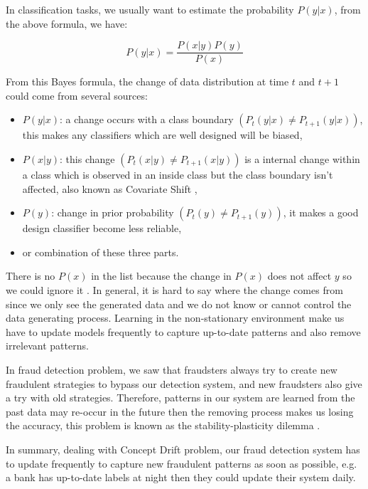 In classification tasks, we usually want to estimate the probability $P(y|x)$, from the above formula, we have:


\begin{equation}
P(y|x) = \frac{P(x|y)P(y)}{P(x)}
\end{equation}


From this Bayes formula, the change of data distribution at time $t$ and $t + 1$ could come from several sources\citep{kelly1999impact}:

\begin{itemize}
\item $P(y|x)$: a change occurs with a class boundary $( P_t(y|x) \neq P_{t+1}(y|x) )$, this makes any classifiers which are well designed will be biased,
\item $P(x|y)$: this change $( P_t(x|y) \neq P_{t+1}(x|y) )$ is a internal change within a class which is observed in an inside class but the class boundary isn't affected, also known as Covariate Shift \citep{moreno2012unifying},
\item $P(y)$: change in prior probability $( P_t(y) \neq P_{t+1}(y) )$, it makes a good design classifier become less reliable,
\item or combination of these three parts.
\end{itemize}

There is no $P(x)$ in the list because the change in $P(x)$ does not affect $y$ so we could ignore it \citep{hoens2012learning}.  In general, it is hard to say where the change comes from since we only see the generated data and we do not know or cannot control the data generating process. Learning in the non-stationary environment make us have to update models frequently to capture up-to-date patterns and also remove irrelevant patterns.

In fraud detection problem, we saw that fraudsters always try to create new fraudulent strategies to bypass our detection system, and new fraudsters also give a try with old strategies. Therefore, patterns in our system are learned from the past data may re-occur in the future then the removing process makes us losing the accuracy, this problem is known as the stability-plasticity dilemma \citep{grossberg1988nonlinear}.

In summary, dealing with Concept Drift problem, our fraud detection system has to update frequently to capture new fraudulent patterns as soon as possible, e.g. a bank has up-to-date labels at night then they could update their system daily.


